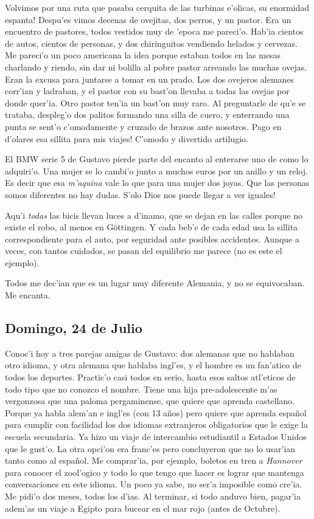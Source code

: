 Volvimos por una ruta que pasaba cerquita de las turbinas e'olicas,
\textexclamdown su enormidad espanta! Despu'es vimos decenas de ovejitas,
dos perros, y un pastor. Era un encuentro de pastores, todos vestidos muy de
'epoca me pareci'o. Hab'ia cientos de autos, cientos de personas, y dos
chiringuitos vendiendo helados y cervezas. Me pareci'o un poco americana la idea
porque estaban todos en las mesas charlando y riendo, sin dar ni bolilla al
pobre pastor arreando las muchas ovejas. Eran la excusa para juntarse a tomar en
un prado. Los dos ovejeros alemanes corr'ian y ladraban, y el pastor con su
bast'on llevaba a todas las ovejas por donde quer'ia. Otro pastor ten'ia un
bast'on muy raro. Al preguntarle de qu'e se trataba, despleg'o dos palitos
formando una silla de cuero, y enterrando una punta se sent'o c'omodamente y
cruzado de brazos ante nosotros. \textexclamdown Pago en d'olares esa sillita
para mis viajes! C'omodo y divertido artilugio.

El BMW serie 5 de Gustavo pierde parte del encanto al enterarse uno de como lo
adquiri'o. Una mujer se lo cambi'o junto a muchos euros por un anillo y un
reloj. Es decir que esa \emph{m'aquina} vale lo que para una mujer dos joyas.
Que las personas somos diferentes no hay dudas. \textexclamdown S'olo Dios nos
puede llegar a ver iguales!

Aqu'i \emph{todas} las bicis llevan luces a d'inamo, que se dejan en las calles
porque no existe el robo, al menos en G\"ottingen. Y cada beb'e de cada edad usa
la sillita correspondiente para el auto, por seguridad ante posibles accidentes.
Aunque a veces, con tantos cuidados, se pasan del equilibrio me parece (no es
este el ejemplo).

Todos me dec'ian que es un lugar muy diferente Alemania, y no se equivocaban. Me
encanta.

\subsection*{Domingo, 24 de Julio}

Conoc'i hoy a tres parejas amigas de Gustavo: dos alemanas que no hablaban otro
idioma, y otra alemana que hablaba ingl'es, y el hombre es un fan'atico de todos
los deportes. Practic'o casi todos en serio, hasta esos saltos atl'eticos de
todo tipo que no conozco el nombre. Tiene una hija pre-adolescente m'as
vergonzosa que una paloma pergaminense, que quiere que aprenda castellano.
Porque ya habla alem'an e ingl'es (con 13 a\~nos) pero quiere que aprenda
espa\~nol para cumplir con facilidad los dos idiomas extranjeros obligatorios
que le exige la escuela secundaria. Ya hizo un viaje de intercambio estudiantil
a Estados Unidos que le gust'o. La otra opci'on era franc'es pero concluyeron
que no lo usar'ian tanto como al espa\~nol. Me comprar'ia, por ejemplo, boletos
en tren a \emph{Hannover} para conocer el zool'ogico y todo lo que tengo que
hacer es lograr que mantenga conversaciones en este idioma. Un poco ya sabe, no
ser'a imposible como cre'ia. Me pidi'o dos meses, todos los d'ias. Al terminar,
si todo anduvo bien, pagar'ia adem'as un viaje a Egipto para bucear en el mar
rojo (antes de Octubre).

